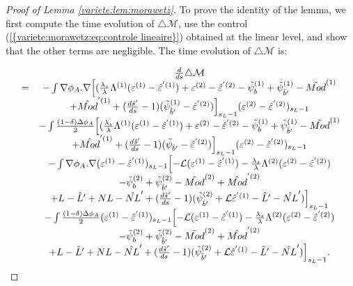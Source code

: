 \documentclass[11pt,a4paper,reqno]{amsart}
\theoremstyle{remark}
\numberwithin{equation}{section}
\begin{document}
\begin{proof}[Proof of Lemma \ref{variete:lem:morawetz}]

To prove the identity of the lemma, we first compute the time evolution of $\triangle \mathcal{M}$, use the control {{\rm (\ref{{variete:morawetz:eq:controle lineaire}})}} obtained at the linear level, and show that the other terms are negligible. The time evolution of $\triangle \mathcal{M}$ is:

\begin{equation} \label{variete:morawetz:eq:expression dtM}
\begin{array}{r c l}
&\frac{d}{ds}\triangle \mathcal{M}\\
=& -\int \nabla \phi_A .\nabla \Bigl{[} (\frac{\lambda_s}{\lambda}\Lambda^{(1)}(\varepsilon^{(1)}-\hat{\varepsilon}^{'(1)})+\varepsilon^{(2)}-\hat{\varepsilon}^{'(2)}-\tilde{\psi}_b^{(1)}+\tilde{\psi}_{\hat{b}'}^{(1)}-\tilde{Mod}^{(1)}\\
&+\hat{Mod}^{'(1)}+(\frac{d\hat{s}'}{ds}-1)(\tilde{\psi}_{\hat{b}'}^{(1)}-\hat{\varepsilon}^{'(2)})  \Bigr{]}_{s_L-1} (\varepsilon^{(2)}-\hat{\varepsilon}^{'(2)})_{s_L-1} \\
&- \int \frac{(1-\delta)\Delta \phi_A}{2}\Bigl{[} (\frac{\lambda_s}{\lambda}\Lambda^{(1)}(\varepsilon^{(1)}-\hat{\varepsilon}^{'(1)})+\varepsilon^{(2)}-\hat{\varepsilon}^{'(2)}-\tilde{\psi}_b^{(1)}+\tilde{\psi}_{\hat{b}'}^{(1)}-\tilde{Mod}^{(1)}\\
&+\hat{Mod}^{'(1)}+(\frac{d\hat{s}'}{ds}-1)(\tilde{\psi}_{\hat{b}'}-\hat{\varepsilon}^{'(2)})  \Bigr{]}_{s_L-1} (\varepsilon^{(2)}-\hat{\varepsilon}^{'(2)})_{s_L-1} \\
&-\int \nabla \phi_A .\nabla (\varepsilon^{(1)}-\hat{\varepsilon}^{'(1)})_{s_L-1}\Bigl{[}-\mathcal{L}(\varepsilon^{(1)}-\hat{\varepsilon}^{'(1)})-\frac{\lambda_s}{\lambda}\Lambda^{(2)}(\varepsilon^{(2)}-\hat{\varepsilon}^{'(2)})\\
&-\tilde{\psi}_b^{(2)}+\tilde{\psi}_{\hat{b}'}^{(2)}-\tilde{Mod}^{(2)}+\hat{Mod}^{'(2)}\\
&+L-\hat{L}'+NL-\hat{NL}'+(\frac{d\hat{s}'}{ds}-1)(\tilde{\psi}_{\hat{b}'}^{(2)}+\mathcal{L}\hat{\varepsilon}^{'(1)}-\hat{L}'-\hat{NL}')\Bigr{]}_{s_L-1} \\
&- \int \frac{(1-\delta)\Delta \phi_A}{2}(\varepsilon^{(1)}-\hat{\varepsilon}^{'(1)})_{s_L-1} \Bigl{[}-\mathcal{L}(\varepsilon^{(1)}-\hat{\varepsilon}^{'(1)})-\frac{\lambda_s}{\lambda}\Lambda^{(2)}(\varepsilon^{(2)}-\hat{\varepsilon}^{'(2)})\\
&-\tilde{\psi}_b^{(2)}+\tilde{\psi}_{\hat{b}'}^{(2)}-\tilde{Mod}^{(2)}+\hat{Mod}^{'(2)}\\
&+L-\hat{L}'+NL-\hat{NL}'+(\frac{d\hat{s}'}{ds}-1)(\tilde{\psi}_{\hat{b}'}^{(2)}+\mathcal{L}\hat{\varepsilon}^{'(1)}-\hat{L}'-\hat{NL}')\Bigr{]}_{s_L-1} .
\end{array}
\end{equation}


\end{proof}
\end{document}
